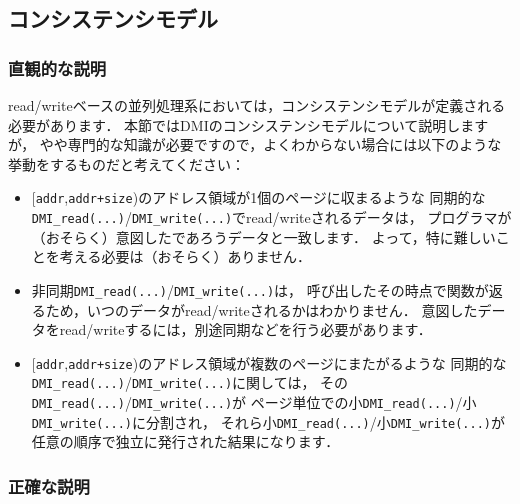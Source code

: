 \documentclass[report,12pt]{jsbook}
\begin{document}
\subsection{コンシステンシモデル}

\subsubsection{直観的な説明}

read/writeベースの並列処理系においては，コンシステンシモデルが定義される必要があります．
本節ではDMIのコンシステンシモデルについて説明しますが，
やや専門的な知識が必要ですので，よくわからない場合には以下のような挙動をするものだと考えてください：
\begin{itemize}
\item $[$\texttt{addr},\texttt{addr+size})のアドレス領域が1個のページに収まるような
  同期的な\texttt{DMI\_read(...)}/\texttt{DMI\_write(...)}でread/writeされるデータは，
  プログラマが（おそらく）意図したであろうデータと一致します．
  よって，特に難しいことを考える必要は（おそらく）ありません．
\item 非同期\texttt{DMI\_read(...)}/\texttt{DMI\_write(...)}は，
  呼び出したその時点で関数が返るため，いつのデータがread/writeされるかはわかりません．
  意図したデータをread/writeするには，別途同期などを行う必要があります．
\item $[$\texttt{addr},\texttt{addr+size})のアドレス領域が複数のページにまたがるような
  同期的な\texttt{DMI\_read(...)}/\texttt{DMI\_write(...)}に関しては，
  その\texttt{DMI\_read(...)}/\texttt{DMI\_write(...)}が
  ページ単位での小\texttt{DMI\_read(...)}/小\texttt{DMI\_write(...)}に分割され，
  それら小\texttt{DMI\_read(...)}/小\texttt{DMI\_write(...)}が任意の順序で独立に発行された結果になります．
\end{itemize}

\subsubsection{正確な説明}
\end{document}
